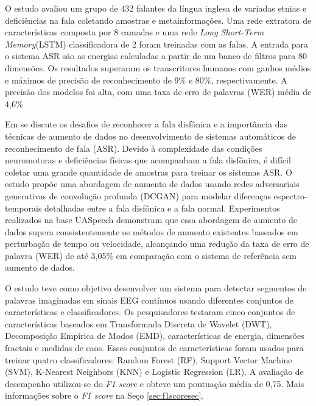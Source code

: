 \documentclass[a4paper,12pt,openright,oneside]{book}
\newenvironment{myenv}[1]
  {\begin{spacing}{#1}}
  {\end{spacing}}
\begin{document}
\begin{myenv}{1.5}
				\par O estudo \cite{WOS:000841879504172} avaliou um grupo de 432 falantes da língua inglesa de variadas etnias e deficiências na fala coletando amostras e metainformações. Uma rede extratora de características composta por 8 camadas e uma rede \textit{Long Short-Term Memory}(LSTM) classificadora de 2 foram treinadas com as falas. A entrada para o sistema ASR são as energias calculadas a partir de um banco de filtros para 80 dimensões. Os resultados superaram os transcritores humanos com ganhos médios e máximos de precisão de reconhecimento de 9\% e 80\%, respectivamente. A precisão dos modelos foi alta, com uma taxa de erro de palavras (WER) média de 4,6\%\newline
				
				\par  Em \cite{jin21_interspeech} se discute os desafios de reconhecer a fala disfônica e a importância das técnicas de aumento de dados no desenvolvimento de sistemas automáticos de reconhecimento de fala (ASR). Devido à complexidade das condições neuromotoras e deficiências físicas que acompanham a fala disfônica, é difícil coletar uma grande quantidade de amostras para treinar os sistemas ASR. O estudo propõe uma abordagem de aumento de dados usando redes adversariais generativas de convolução profunda (DCGAN) para modelar diferenças espectro-temporais detalhadas entre a fala disfônica e a fala normal. Experimentos realizados na base UASpeech demonstram que essa abordagem de aumento de dados supera consistentemente os métodos de aumento existentes baseados em perturbação de tempo ou velocidade, alcançando uma redução da taxa de erro de palavra (WER) de até 3,05\% em comparação com o sistema de referência sem aumento de dados.\newline
				
				\par O estudo \cite{WOS:000614122200021} teve como objetivo desenvolver um sistema para detectar segmentos de palavras imaginadas em sinais EEG contínuos usando diferentes conjuntos de características e classificadores. Os pesquisadores testaram cinco conjuntos de características baseados em Transformada Discreta de Wavelet (DWT), Decomposição Empírica de Modos (EMD), características de energia, dimensões fractais e medidas de caos. Esses conjuntos de características foram usados para treinar quatro classificadores: Random Forest (RF), Support Vector Machine (SVM), K-Nearest Neighbors (KNN) e Logistic Regression (LR). A avaliação de desempenho utilizou-se do \textit{F1 score} \cite{tharwat2020classification} e obteve um pontuação média de 0,75. Mais informações sobre o \textit{F1 score} na Seço \ref{sec:f1scoresec}.\newline
				

\end{myenv}
\end{document}
